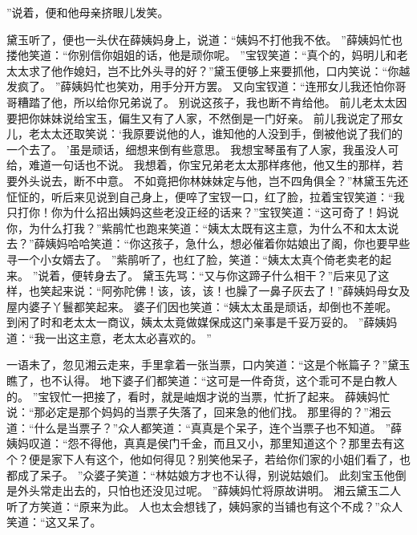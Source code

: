 ”说着，便和他母亲挤眼儿发笑。
\par
黛玉听了，便也一头伏在薛姨妈身上，说道：“姨妈不打他我不依。
”薛姨妈忙也搂他笑道：“你别信你姐姐的话，他是顽你呢。
”宝钗笑道：“真个的，妈明儿和老太太求了他作媳妇，岂不比外头寻的好？”黛玉便够上来要抓他，口内笑说：“你越发疯了。
”薛姨妈忙也笑劝，用手分开方罢。
又向宝钗道：“连邢女儿我还怕你哥哥糟踏了他，所以给你兄弟说了。
别说这孩子，我也断不肯给他。
前儿老太太因要把你妹妹说给宝玉，偏生又有了人家，不然倒是一门好亲。
前儿我说定了邢女儿，老太太还取笑说：‘我原要说他的人，谁知他的人没到手，倒被他说了我们的一个去了。
’虽是顽话，细想来倒有些意思。
我想宝琴虽有了人家，我虽没人可给，难道一句话也不说。
我想着，你宝兄弟老太太那样疼他，他又生的那样，若要外头说去，断不中意。
不如竟把你林妹妹定与他，岂不四角俱全？”林黛玉先还怔怔的，听后来见说到自己身上，便啐了宝钗一口，红了脸，拉着宝钗笑道：“我只打你！你为什么招出姨妈这些老没正经的话来？”宝钗笑道：“这可奇了！妈说你，为什么打我？”紫鹃忙也跑来笑道：“姨太太既有这主意，为什么不和太太说去？”薛姨妈哈哈笑道：“你这孩子，急什么，想必催着你姑娘出了阁，你也要早些寻一个小女婿去了。
”紫鹃听了，也红了脸，笑道：“姨太太真个倚老卖老的起来。
”说着，便转身去了。
黛玉先骂：“又与你这蹄子什么相干？”后来见了这样，也笑起来说：“阿弥陀佛！该，该，该！也臊了一鼻子灰去了！”薛姨妈母女及屋内婆子丫鬟都笑起来。
婆子们因也笑道：“姨太太虽是顽话，却倒也不差呢。
到闲了时和老太太一商议，姨太太竟做媒保成这门亲事是千妥万妥的。
”薛姨妈道：“我一出这主意，老太太必喜欢的。
”\par
一语未了，忽见湘云走来，手里拿着一张当票，口内笑道：“这是个帐篇子？”黛玉瞧了，也不认得。
地下婆子们都笑道：“这可是一件奇货，这个乖可不是白教人的。
”宝钗忙一把接了，看时，就是岫烟才说的当票，忙折了起来。
薛姨妈忙说：“那必定是那个妈妈的当票子失落了，回来急的他们找。
那里得的？”湘云道：“什么是当票子？”众人都笑道：“真真是个呆子，连个当票子也不知道。
”薛姨妈叹道：“怨不得他，真真是侯门千金，而且又小，那里知道这个？那里去有这个？便是家下人有这个，他如何得见？别笑他呆子，若给你们家的小姐们看了，也都成了呆子。
”众婆子笑道：“林姑娘方才也不认得，别说姑娘们。
此刻宝玉他倒是外头常走出去的，只怕也还没见过呢。
”薛姨妈忙将原故讲明。
湘云黛玉二人听了方笑道：“原来为此。
人也太会想钱了，姨妈家的当铺也有这个不成？”众人笑道：“这又呆了。
